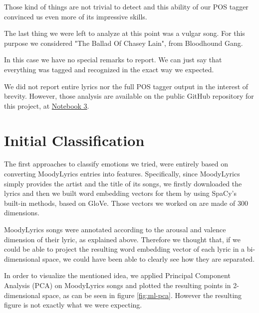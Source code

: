 Those kind of things are not trivial to detect and this ability of our POS tagger convinced us even more
of its impressive skills.

The last thing we were left to analyze at this point was a vulgar song. For this purpose we considered 
"The Ballad Of Chasey Lain", from Bloodhound Gang. 

In this case we have no special remarks to report. We can just say that everything was tagged and
recognized in the exact way we expected.

We did not report entire lyrics nor the full POS tagger output in the interest of brevity. However, those analysis are available on the public GitHub repository for this project, at \href{https://github.com/sgiammy/emotion-patterns-in-music-playlists/blob/master/Notebook/3_POS_tagger_verification.ipynb}{Notebook 3}.

\section{Initial Classification}

The first approaches to classify emotions we tried, were entirely based on converting
MoodyLyrics entries into features. Specifically, since MoodyLyrics simply provides the
artist and the title of its songs, we firstly downloaded the lyrics and then we built
word embedding vectors for them by using SpaCy's built-in methods, based on GloVe.
Those vectors we worked on are made of 300 dimensions.

MoodyLyrics songs were annotated according to the arousal and valence dimension of their lyric,
as explained above. Therefore we thought that, if we could be able to project the resulting
word embedding vector of each lyric in a bi-dimensional space, we could have been able to 
clearly see how they are separated.

In order to visualize the mentioned idea, we applied Principal Component Analysis (PCA) on
MoodyLyrics songs and plotted the resulting points in 2-dimensional space, as can be seen in figure \ref{fig:ml-pca}. However the resulting figure is not exactly what we were expecting.

